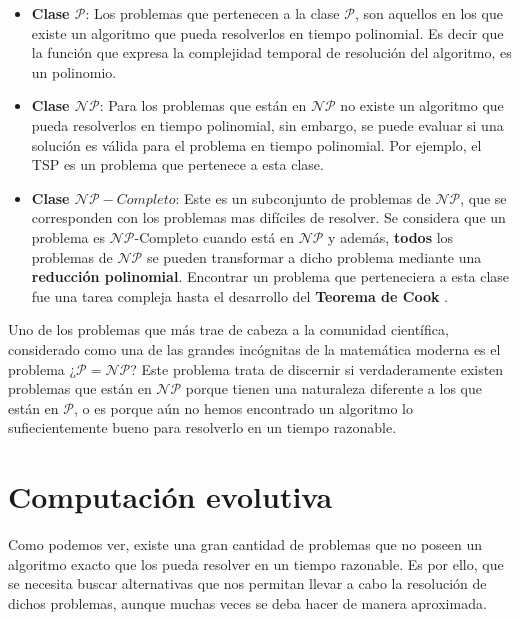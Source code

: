 \begin{itemize}
    \item \textbf{Clase $\mathcal{P}$}: Los problemas que pertenecen a la clase $\mathcal{P}$, son aquellos en los que existe un algoritmo que pueda resolverlos en tiempo polinomial. Es decir que la función que expresa la complejidad temporal de resolución del algoritmo, es un polinomio.
    \item \textbf{Clase $\mathcal{NP}$}: Para los problemas que están en $\mathcal{NP}$ no existe un algoritmo que pueda resolverlos en tiempo polinomial, sin embargo, se puede evaluar si una solución es válida para el problema en tiempo polinomial. Por ejemplo, el TSP es un problema que pertenece a esta clase.
    \item \textbf{Clase $\mathcal{NP}-Completo$}: Este es un subconjunto de problemas de $\mathcal{NP}$, que se corresponden con los problemas mas difíciles de resolver. Se considera que un problema es $\mathcal{NP}$-Completo cuando está en $\mathcal{NP}$ y además, \textbf{todos} los problemas de $\mathcal{NP}$ se pueden transformar a dicho problema mediante una \textbf{reducción polinomial}. Encontrar un problema que perteneciera a esta clase fue una tarea compleja hasta el desarrollo del \textbf{Teorema de Cook} \cite{garey2002computers}.
\end{itemize}

Uno de los problemas que más trae de cabeza a la comunidad científica, considerado como una de las grandes incógnitas de la matemática moderna es el problema ¿$\mathcal{P} = \mathcal{NP}$? Este problema trata de discernir si verdaderamente existen problemas que están en $\mathcal{NP}$ \cite{baker1975relativizations} porque tienen una naturaleza diferente a los que están en $\mathcal{P}$, o es porque aún no hemos encontrado un algoritmo lo sufiecientemente bueno para resolverlo en un tiempo razonable.

\section{Computación evolutiva}
\label{1:sec:2}

Como podemos ver, existe una gran cantidad de problemas que no poseen un algoritmo exacto que los pueda resolver en un tiempo razonable. Es por ello, que se necesita buscar alternativas que nos permitan llevar a cabo la resolución de dichos problemas, aunque muchas veces se deba hacer de manera aproximada. \\

